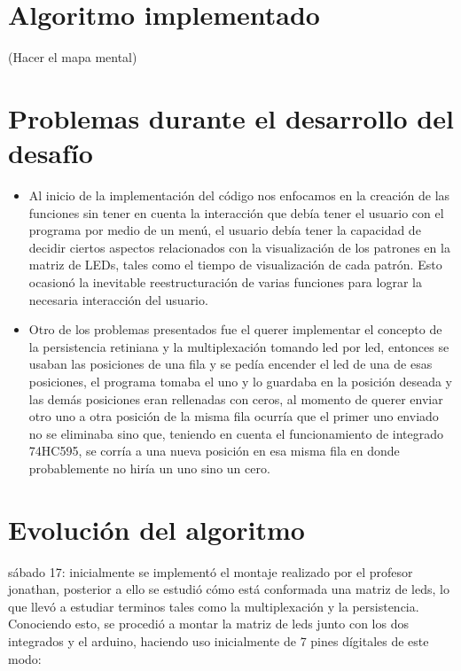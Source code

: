 \documentclass{article}
\begin{document}
\section{Algoritmo implementado} \label{imagenes}
(Hacer el mapa mental)
\section{Problemas durante el desarrollo del desafío}
\begin{itemize}
\item Al inicio de la implementación del código nos enfocamos en la creación de las funciones sin tener en cuenta la interacción que debía tener el usuario con el programa por medio de un menú, el usuario debía tener la capacidad de decidir ciertos aspectos relacionados con la visualización de los patrones en la matriz de LEDs, tales como el tiempo de visualización de cada patrón. Esto ocasionó la inevitable reestructuración de varias funciones para lograr la necesaria interacción del usuario.
\item Otro de los problemas presentados fue el querer implementar el concepto de la persistencia retiniana y la multiplexación tomando led por led, entonces se usaban las posiciones de una fila y se pedía encender el led de una de esas posiciones, el programa tomaba el uno y lo guardaba en la posición deseada y las demás posiciones eran rellenadas con ceros, al momento de querer enviar otro uno a otra posición de la misma fila ocurría que el primer uno enviado no se eliminaba sino que, teniendo en cuenta el funcionamiento de integrado 74HC595, se corría a una nueva posición en esa misma fila en donde probablemente no hiría un uno sino un cero.
\end{itemize}
\label{imagenes}
\section{Evolución del algoritmo} \label{imagenes}
sábado 17: inicialmente se implementó el montaje realizado por el profesor jonathan, posterior a ello se estudió cómo está conformada una matriz de leds, lo que llevó a estudiar terminos tales como la multiplexación y la persistencia. Conociendo esto, se procedió a montar la matriz de leds junto con los dos integrados y el arduino, haciendo uso inicialmente de 7 pines dígitales de este modo:
\end{document}
